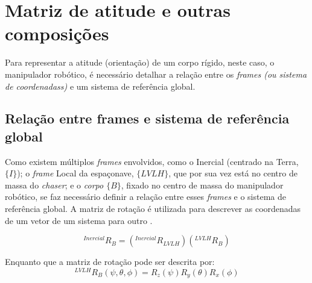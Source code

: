 \section{Matriz de atitude e outras composições}

Para representar a atitude (orientação) de um corpo rígido, neste caso, o manipulador robótico, é necessário detalhar a relação entre os \emph{frames (ou sistema de coordenadass)} e um sistema de referência global.

\subsection{Relação entre frames e sistema de referência global}
Como existem múltiplos
\emph{frames} envolvidos, como o Inercial (centrado na Terra, $\{I\}$);
o \emph{frame} Local da espaçonave, $\{LVLH\}$, que por sua vez está no centro de massa do \emph{chaser};
e o \emph{corpo $\{B\}$}, fixado no centro de massa do manipulador robótico,
se faz necessário definir a relação entre esses \emph{frames} e o sistema de referência global.
A matriz de rotação é utilizada para descrever as coordenadas de um vetor de um sistema para outro \cite{craig2005}.

\begin{equation}
    \label{eq:matriz_atitude}
    {}^{Inercial} R_{B} = ({}^{Inercial}R_{LVLH}) ({}^{LVLH} R_{B})
\end{equation}

Enquanto que a matriz de rotação pode ser descrita por:
\begin{equation}
    \label{eq:matriz_rotacao}
    {}^{LVLH} R_{B} (\psi,\theta,\phi) = 
    R_z(\psi) R_y(\theta) R_x(\phi)
\end{equation}


